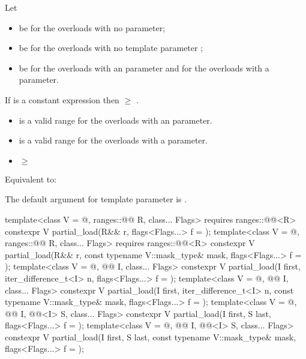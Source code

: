 \begin{itemdescr}
\pnum
Let
\begin{itemize}
 \item
    be  for the overloads with no
    parameter;
 \item
    be  for the overloads with no
   template parameter ;
 \item
    be  for the overloads with an 
   parameter and  for the overloads with a 
   parameter.
\end{itemize}

\pnum
\mandates
If  is a constant expression then
 $\ge$ .

\pnum
\expects
\begin{itemize}
\item {} is a valid range for the overloads with an
   parameter.
\item {} is a valid range for the overloads with a
   parameter.
\item {} $\ge$ 
\end{itemize}

\pnum
\effects
Equivalent to: 

\pnum
\remarks
The default argument for template parameter  is
.
\end{itemdescr}

\begin{itemdecl}
template<class V = @\seebelow@, ranges::@@ R, class... Flags>
  requires ranges::@@<R>
  constexpr V partial_load(R&& r, flags<Flags...> f = {});
template<class V = @\seebelow@, ranges::@@ R, class... Flags>
  requires ranges::@@<R>
  constexpr V partial_load(R&& r, const typename V::mask_type& mask, flags<Flags...> f = {});
template<class V = @\seebelow@, @@ I, class... Flags>
  constexpr V partial_load(I first, iter_difference_t<I> n, flags<Flags...> f = {});
template<class V = @\seebelow@, @@ I, class... Flags>
  constexpr V partial_load(I first, iter_difference_t<I> n, const typename V::mask_type& mask,
                           flags<Flags...> f = {});
template<class V = @\seebelow@, @@ I, @@<I> S, class... Flags>
  constexpr V partial_load(I first, S last, flags<Flags...> f = {});
template<class V = @\seebelow@, @@ I, @@<I> S, class... Flags>
  constexpr V partial_load(I first, S last, const typename V::mask_type& mask,
                           flags<Flags...> f = {});
\end{itemdecl}

